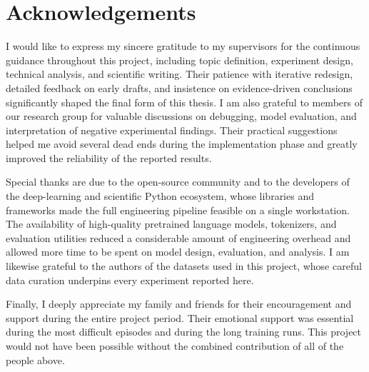 \section*{Acknowledgements}

I would like to express my sincere gratitude to my supervisors for the continuous guidance throughout this project, including topic definition, experiment design, technical analysis, and scientific writing. Their patience with iterative redesign, detailed feedback on early drafts, and insistence on evidence-driven conclusions significantly shaped the final form of this thesis. I am also grateful to members of our research group for valuable discussions on debugging, model evaluation, and interpretation of negative experimental findings. Their practical suggestions helped me avoid several dead ends during the implementation phase and greatly improved the reliability of the reported results.

Special thanks are due to the open-source community and to the developers of the deep-learning and scientific Python ecosystem, whose libraries and frameworks made the full engineering pipeline feasible on a single workstation. The availability of high-quality pretrained language models, tokenizers, and evaluation utilities reduced a considerable amount of engineering overhead and allowed more time to be spent on model design, evaluation, and analysis. I am likewise grateful to the authors of the datasets used in this project, whose careful data curation underpins every experiment reported here.

Finally, I deeply appreciate my family and friends for their encouragement and support during the entire project period. Their emotional support was essential during the most difficult episodes and during the long training runs. This project would not have been possible without the combined contribution of all of the people above.
